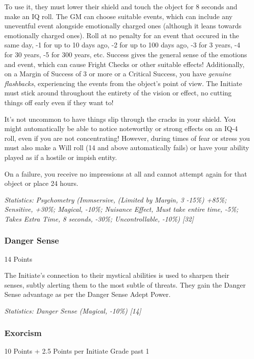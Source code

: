 \begin{multicols}{3}
	To use it, they must lower their shield and touch the object for 8 seconds and make an IQ roll. The GM can choose suitable events, which can include any uneventful event alongside emotionally charged ones (although it leans towards emotionally charged ones). Roll at no penalty for an event that occured in the same day, -1 for up to 10 days ago, -2 for up to 100 days ago, -3 for 3 years, -4 for 30 years, -5 for 300 years, etc. Success gives the general sense of the emotions and event, which can cause Fright Checks or other suitable effects! Additionally, on a Margin of Success of 3 or more or a Critical Success, you have \textit{genuine flashbacks}, experiencing the events from the object's point of view. The Initiate must stick around throughout the entirety of the vision or effect, no cutting things off early even if they want to!
	
	It's not uncommon to have things slip through the cracks in your shield. You might automatically be able to notice noteworthy or strong effects on an IQ-4 roll, even if you are not concentrating! However, during times of fear or stress you must also make a Will roll (14 and above automatically fails) or have your ability played as if a hostile or impish entity.
	
	On a failure, you receive no impressions at all and cannot attempt again for that object or place 24 hours.
	
	\textcolor{OliveGreen}{\textit{Statistics: Psychometry (Immsersive, (Limited by Margin, 3 -15\%) +85\%; Sensitive, +30\%; Magical, -10\%; Nuisance Effect, Must take entire time, -5\%; Takes Extra Time, 8 seconds, -30\%; Uncontrollable, -10\%) [32] }}
	
	\subsubsection{Danger Sense}
	\begin{flushright}
		14 Points
	\end{flushright}
	
	The Initiate's connection to their mystical abilities is used to sharpen their senses, subtly alerting them to the most subtle of threats. They gain the Danger Sense advantage as per the Danger Sense Adept Power.
	
	\textcolor{OliveGreen}{\textit{Statistics: Danger Sense (Magical, -10\%) [14] }}
	
	\subsubsection{Exorcism}
	\begin{flushright}
		10 Points + 2.5 Points per Initiate Grade past 1
	\end{flushright}


\end{multicols}
